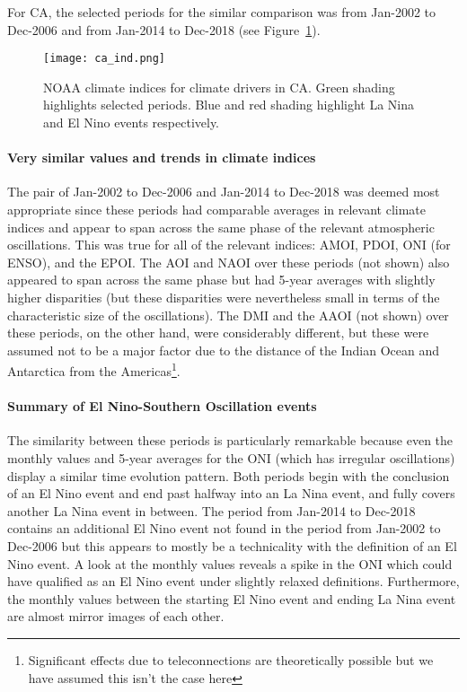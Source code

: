 For \ac{CA}, the selected periods for the similar comparison was from Jan-2002 to Dec-2006 and from Jan-2014 to Dec-2018 (see Figure~\ref{fig:ca_ind}).

\begin{figure}[!htp]
	\centering
	\texttt{[image: ca\_ind.png]}
	\caption[CA's and SA's relevant climate indices for similar comparison]{\ac{NOAA} climate indices for climate drivers in \ac{CA}. Green shading highlights selected periods. Blue and red shading highlight La Nina and El Nino events respectively.}
	\label{fig:ca_ind}
\end{figure}

\paragraph{Very similar values and trends in climate indices}

The pair of Jan-2002 to Dec-2006 and Jan-2014 to Dec-2018 was deemed most appropriate since these periods had comparable averages in relevant climate indices and appear to span across the same phase of the relevant atmospheric oscillations. This was true for all of the relevant indices: \ac{AMOI}, \ac{PDOI}, \ac{ONI} (for \ac{ENSO}), and the \ac{EPOI}. The \ac{AOI} and \ac{NAOI} over these periods (not shown) also appeared to span across the same phase but had 5-year averages with slightly higher disparities (but these disparities were nevertheless small in terms of the characteristic size of the oscillations). The \ac{DMI} and the \ac{AAOI} (not shown) over these periods, on the other hand, were considerably different, but these were assumed not to be a major factor due to the distance of the Indian Ocean and Antarctica from the Americas\footnote{Significant effects due to teleconnections are theoretically possible but we have assumed this isn't the case here}.

\paragraph{Summary of El Nino-Southern Oscillation events}

The similarity between these periods is particularly remarkable because even the monthly values and 5-year averages for the \ac{ONI} (which has irregular oscillations) display a similar time evolution pattern. Both periods begin with the conclusion of an El Nino event and end past halfway into an La Nina event, and fully covers another La Nina event in between. The period from Jan-2014 to Dec-2018 contains an additional El Nino event not found in the period from Jan-2002 to Dec-2006 but this appears to mostly be a technicality with the definition of an El Nino event. A look at the monthly values reveals a spike in the \ac{ONI} which could have qualified as an El Nino event under slightly relaxed definitions. Furthermore, the monthly values between the starting El Nino event and ending La Nina event are almost mirror images of each other.

